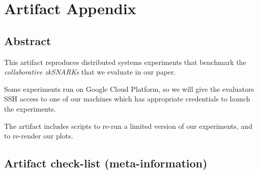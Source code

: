 \documentclass[letterpaper,twocolumn,10pt]{article}
\begin{document}


\appendix
\section{Artifact Appendix}

%

\subsection{Abstract}

This artifact reproduces distributed systems experiments
that benchmark the \textit{collaborative zkSNARKs} that we evaluate in our
paper.

Some experiments run on Google Cloud Platform, so we will give the evaluators
SSH access to one of our machines which has appropriate credentials to launch
the experiments.

The artifact includes scripts to re-run a limited version of our experiments,
and to re-render our plots.

\subsection{Artifact check-list (meta-information)}
\end{document}
